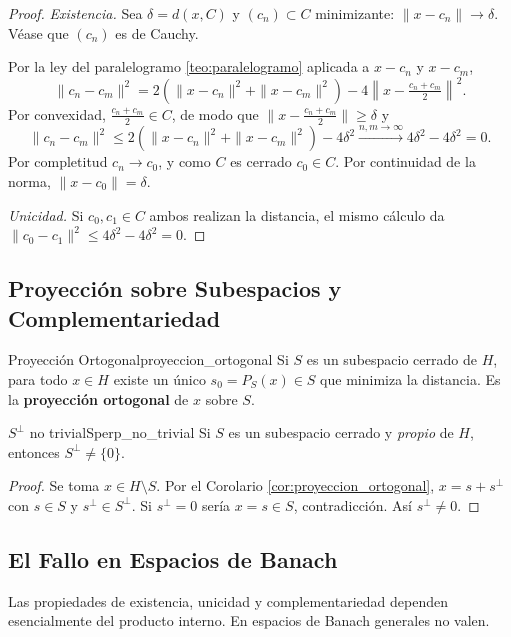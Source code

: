 \documentclass[11pt, a4paper]{article}
\begin{document}
\begin{proof}
\textit{Existencia.} Sea $\delta = d(x, C)$ y $(c_n) \subset C$ minimizante:
$\|x - c_n\| \to \delta$. Véase que $(c_n)$ es de Cauchy.

Por la ley del paralelogramo \ref{teo:paralelogramo} aplicada a $x - c_n$ y $x - c_m$,
$$ \|c_n - c_m\|^2 = 2(\|x - c_n\|^2 + \|x - c_m\|^2) - 4\left\|x - \tfrac{c_n + c_m}{2}\right\|^2.
$$
Por convexidad, $\tfrac{c_n + c_m}{2} \in C$, de modo que $\|x - \tfrac{c_n + c_m}{2}\| \ge \delta$ y
$$ \|c_n - c_m\|^2 \le 2(\|x - c_n\|^2 + \|x - c_m\|^2) - 4\delta^2 \xrightarrow{n,m \to \infty}
4\delta^2 - 4\delta^2 = 0. $$
Por completitud $c_n \to c_0$, y como $C$ es cerrado $c_0 \in C$. Por continuidad de la norma,
$\|x - c_0\| = \delta$.

\textit{Unicidad.} Si $c_0, c_1 \in C$ ambos realizan la distancia, el mismo cálculo da
$\|c_0 - c_1\|^2 \le 4\delta^2 - 4\delta^2 = 0$.
\end{proof}

\subsection{Proyección sobre Subespacios y Complementariedad}

\begin{corolario}{Proyección Ortogonal}{proyeccion_ortogonal}
Si $S$ es un subespacio cerrado de $H$, para todo $x \in H$ existe un único $s_0 = P_S(x) \in S$
que minimiza la distancia. Es la \textbf{proyección ortogonal} de $x$ sobre $S$.
\end{corolario}

\begin{corolario}{$S^\perp$ no trivial}{Sperp_no_trivial}
Si $S$ es un subespacio cerrado y \emph{propio} de $H$, entonces $S^\perp \ne \{0\}$.
\end{corolario}

\begin{proof}
Se toma $x \in H \setminus S$. Por el Corolario \ref{cor:proyeccion_ortogonal}, $x = s + s^\perp$ con $s \in S$ y
$s^\perp \in S^\perp$. Si $s^\perp = 0$ sería $x = s \in S$, contradicción. Así
$s^\perp \ne 0$.
\end{proof}

\subsection{El Fallo en Espacios de Banach}

Las propiedades de existencia, unicidad y complementariedad dependen esencialmente del producto
interno. En espacios de Banach generales no valen.
\end{document}
